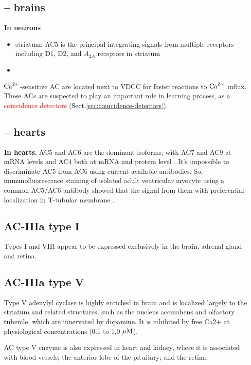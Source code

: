 \subsection{-- brains}

{\bf In neurons}
\begin{itemize}
  \item striatum: AC5 is the principal integrating  signals  from  multiple 
  receptors  including  D1, D2, and  $A_{2A}$ receptors in  striatum 
  \item 
\end{itemize}

${\text{Ca}^{2+}}$-sensitive AC are located next to VDCC for faster reactions to ${\text{Ca}^{2+}}$
influx. These ACs are suspected to play an important role in learning process,
as a \textcolor{red}{coincidence detectors}
(Sect.\ref{sec:coincidence-detectors}).

\subsection{-- hearts}

{\bf In hearts}, AC5 and AC6 are the dominant isoforms; with AC7 and AC9 at mRNA
levels and AC4 both at mRNA and protein level \citep{fischmeister2006}.
It's impossible to discriminate AC5 from AC6 using current available antibodies.
So, immunofluorescence staining of isolated adult ventricular myocyte using a
common AC5/AC6 antibody showed that the signal from them with preferential
localization in T-tubular membrane \citep{fischmeister2006}.

\subsection{AC-IIIa type I}

Types I and VIII appear to be expressed exclusively in the brain,
adrenal gland and retina.

\subsection{AC-IIIa type V}
\label{sec:AC5}
\label{sec:AC-IIIa-type-V}

Type V adenylyl cyclase is highly enriched in brain and is localized largely to
the striatum and related structures, such as the nucleus accumbens and olfactory
tubercle, which are innervated by dopamine. It is inhibited by free Ca2+ at
physiological concentrations (0.1 to 1.0 ${\mu\text{M}}$).
  
AC type V enzyme is also expressed in heart and kidney, where it is associated
with blood vessels; the anterior lobe of the pituitary; and the retina.


